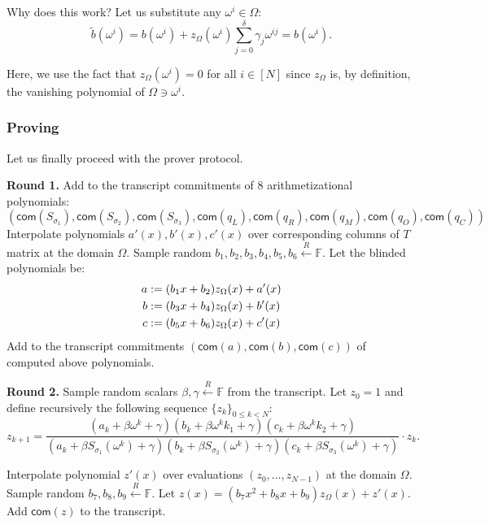 \documentclass[../lecture-notes-148x210.tex]{subfiles}
\begin{document}
Why does this work? Let us substitute any $\omega^i \in \Omega$:
\begin{equation*}
    \widetilde{b}(\omega^i) = b(\omega^i) + z_{\Omega}(\omega^i)\sum_{j=0}^{\delta}\gamma_j\omega^{ij} = b(\omega^i).
\end{equation*}

Here, we use the fact that $z_{\Omega}(\omega^i) = 0$ for all $i \in [N]$ since $z_{\Omega}$ is, 
by definition, the vanishing polynomial of $\Omega \ni \omega^i$.

\subsubsection{Proving}
Let us finally proceed with the prover protocol.

\textcolor{green!60!black}{\textbf{Round 1.}} Add to the transcript commitments
of 8 arithmetizational polynomials:
\begin{equation*}
    (\mathsf{com}(S_{\sigma_1}), \mathsf{com}(S_{\sigma_2}), \mathsf{com}(S_{\sigma_3}), \mathsf{com}(q_L), \mathsf{com}(q_R), \mathsf{com}(q_M), \mathsf{com}(q_O), \mathsf{com}(q_C))
\end{equation*}
Interpolate polynomials $a'(x), b'(x), c'(x)$ over corresponding columns of $T$ matrix at
the domain $\Omega$. Sample random $b_1, b_2, b_3, b_4, b_5, b_6 \xleftarrow{R}
\mathbb{F}$. Let the blinded polynomials be:
\begin{align*}
\centering
a &:= (b_1 x + b_2)z_{\Omega}(x) + a'(x) \\
b &:= (b_3 x + b_4)z_{\Omega}(x) + b'(x) \\
c &:= (b_5 x + b_6)z_{\Omega}(x) + c'(x)
\end{align*}
Add to the transcript commitments $(\mathsf{com}(a), \mathsf{com}(b),
\mathsf{com}(c))$ of computed above polynomials.

\textcolor{green!60!black}{\textbf{Round 2.}}  Sample random scalars $\beta,
\gamma \xleftarrow{R} \mathbb{F}$ from the transcript. Let $z_0 = 1$ and define
recursively the following sequence $\{z_k\}_{0 \leq k < N}$:
\begin{equation*}
    z_{k+1} = \frac{(a_k + \beta \omega^{k} + \gamma) (b_k + \beta \omega^{k}k_1 + \gamma) (c_k + \beta \omega^{k}k_2 + \gamma)}{(a_k + \beta S_{\sigma_1}(\omega^{k}) + \gamma) (b_k + \beta S_{\sigma_2}(\omega^{k}) + \gamma) (c_k + \beta S_{\sigma_3}(\omega^{k}) + \gamma)} \cdot z_k.
\end{equation*}

Interpolate polynomial $z'(x)$ over evaluations $(z_0, \dots, z_{N-1})$ at the
domain $\Omega$. Sample random $b_7, b_8, b_9 \xleftarrow{R} \mathbb{F}$. Let $z(x)
= (b_7 x^2 + b_8 x + b_9)z_{\Omega}(x) + z'(x)$. Add $\mathsf{com}(z)$ to the transcript.
\end{document}
